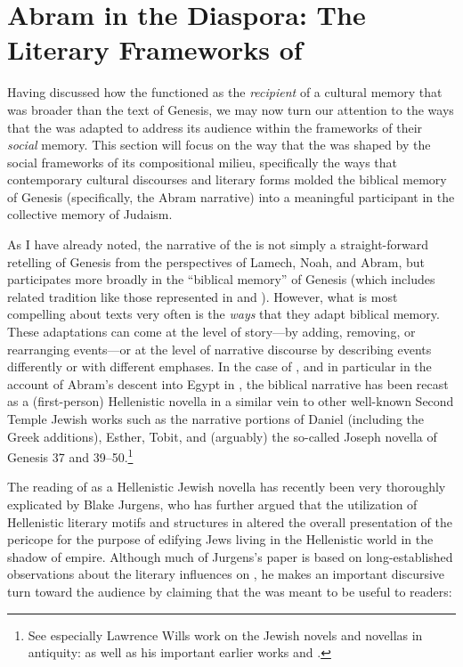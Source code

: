 
\section{Abram in the Diaspora: The Literary Frameworks of \GA}

Having discussed how the \ga functioned as the \emph{recipient} of a cultural memory that was broader than the text of Genesis, we may now turn our attention to the ways that the \ga was adapted to address its audience within the frameworks of their \emph{social} memory. This section will focus on the way that the \ga was shaped by the social frameworks of its compositional milieu, specifically the ways that contemporary cultural discourses and literary forms molded the biblical memory of Genesis (specifically, the Abram narrative) into a meaningful participant in the collective memory of \secondtemple Judaism.

As I have already noted, the narrative of the \ga is not simply a straight-forward retelling of Genesis from the perspectives of Lamech, Noah, and Abram, but participates more broadly in the ``biblical memory'' of Genesis (which includes related tradition like those represented in \firstenoch and \jub). However, what is most compelling about \rwb texts very often is the \emph{ways} that they adapt biblical memory. These adaptations can come at the level of story---by adding, removing, or rearranging events---or at the level of narrative discourse by describing events differently or with different emphases. In the case of \ga, and in particular in the account of Abram's descent into Egypt in , the biblical narrative has been recast as a (first-person) Hellenistic novella in a similar vein to other well-known Second Temple Jewish works such as the narrative portions of Daniel (including the Greek additions), Esther, Tobit, and (arguably) the so-called Joseph novella of Genesis 37 and 39--50.\footnote{See especially Lawrence Wills work on the Jewish novels and novellas in antiquity: \cite*{wills2002} as well as his important earlier works \cite*{wills1995} and \cite{wills1990}.}



The reading of \ga {} as a Hellenistic Jewish novella has recently been very thoroughly explicated by Blake Jurgens, who has further argued that the utilization of Hellenistic literary motifs and structures in \ga altered the overall presentation of the pericope for the purpose of edifying Jews living in the Hellenistic world in the shadow of empire.\autocite{jurgens_jsj2018} Although much of Jurgens's paper is based on long-established observations about the literary influences on \ga, he makes an important discursive turn toward the audience by claiming that the \ga was meant to be useful to readers:

